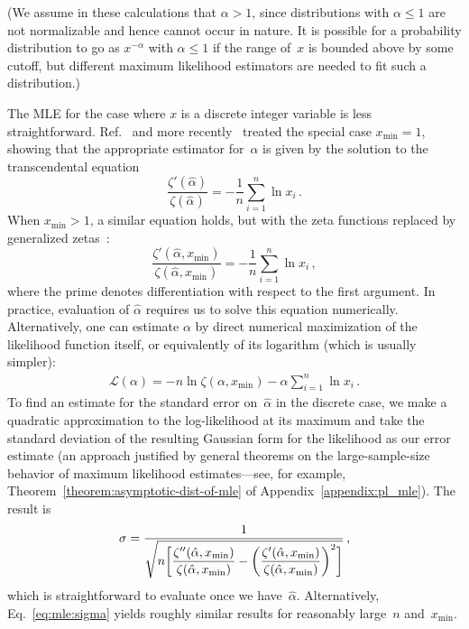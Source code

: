 \documentclass[final]{siamltex}
\newcommand{\xmin}{\ensuremath{x_{\min}}}
\newcommand{\Loglike}{\ensuremath{\mathcal{L}}}
\newcommand{\punctspace}{\,}
\begin{document}
(We assume in these calculations that $\alpha>1$, since distributions with
$\alpha\le1$ are not normalizable and hence cannot occur in nature.  It is
possible for a probability distribution to go as $x^{-\alpha}$ with
$\alpha\le1$ if the range of~$x$ is bounded above by some cutoff, but different
maximum likelihood estimators are needed to fit such a distribution.)

The MLE for the case where $x$ is a discrete integer variable is less
straightforward.  Ref.~\cite{Seal-1952} and more
recently~\cite{Goldstein-Morris-Yen} treated the special case $\xmin=1$,
showing that the appropriate estimator for~$\alpha$ is given by the
solution to the transcendental equation
\begin{equation}
\label{eq:discrete:mle}
\frac{\zeta'(\hat{\alpha})}{\zeta(\hat{\alpha})}
 = -\frac{1}{n}\sum_{i=1}^{n}\ln x_{i} \punctspace.
\end{equation}
When $\xmin>1$, a similar equation holds, but with the zeta functions replaced
by generalized zetas~\cite{Arnold-on-Pareto-distributions,Bauke07,Clauset07}:
\begin{equation}
\frac{\zeta'(\hat{\alpha},\xmin)}{\zeta(\hat{\alpha},\xmin)} =
-\frac{1}{n}\sum_{i=1}^{n}\ln x_{i}\punctspace,
\label{eq:discmle}
\end{equation}
where the prime denotes differentiation with respect to the first argument.  In
practice, evaluation of $\hat{\alpha}$ requires us to solve this equation
numerically.  Alternatively, one can estimate $\alpha$ by direct numerical
maximization of the likelihood function itself, or equivalently of its
logarithm (which is usually simpler):
\begin{align}
\Loglike(\alpha) = -n\ln\zeta(\alpha,\xmin) -
\alpha\sum_{i=1}^{n} \ln x_{i}\punctspace.
\label{eq:discll}
\end{align}
To find an estimate for the standard error on~$\hat{\alpha}$ in the
discrete case, we make a quadratic approximation to the log-likelihood at
its maximum and take the standard deviation of the resulting Gaussian form
for the likelihood as our error estimate (an approach justified by general
theorems on the large-sample-size behavior of maximum likelihood
estimates---see, for example, Theorem~\ref{theorem:asymptotic-dist-of-mle}
of Appendix~\ref{appendix:pl_mle}).  The result is
\begin{equation}
\sigma = {1\over\sqrt{ n\biggl[ \displaystyle
                  \frac{\zeta''(\hat{\alpha},\xmin)}%
                 {\zeta(\hat{\alpha},\xmin)} - 
                 \biggl( \frac{\zeta'(\hat{\alpha},\xmin)}%
	         {\zeta(\hat{\alpha},\xmin)} \biggr)^2 \biggl] }}\punctspace,
\label{eq:mle:d:sigma}
\end{equation}
which is straightforward to evaluate once we have~$\hat{\alpha}$.
Alternatively, Eq.~\eqref{eq:mle:sigma} yields roughly similar results for
reasonably large~$n$ and~$\xmin$.
\end{document}
